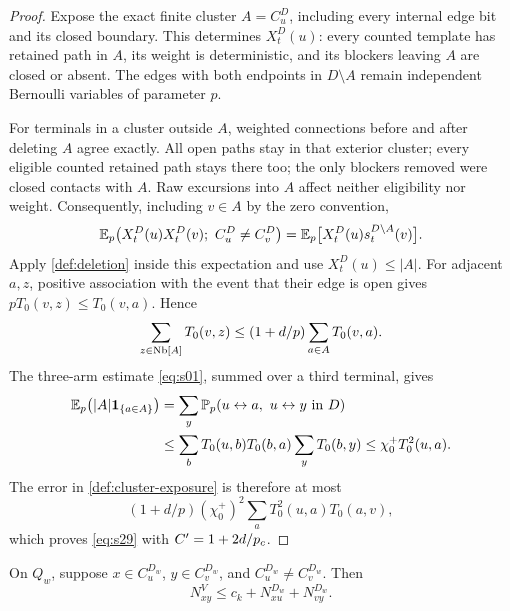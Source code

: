 \begin{proof}
Expose the exact finite cluster $A=C_u^D$, including every internal edge
bit and its closed boundary.  This determines $X_t^D(u)$: every counted
template has retained path in $A$, its weight is deterministic, and its
blockers leaving $A$ are closed or absent.  The edges with both endpoints
in $D\setminus A$ remain independent Bernoulli variables of parameter $p$.

For terminals in a cluster outside $A$, weighted connections before and
after deleting $A$ agree exactly.  All open paths stay in that exterior
cluster; every eligible counted retained path stays there too; the only
blockers removed were closed contacts with $A$.  Raw excursions into $A$
affect neither eligibility nor weight.  Consequently, including $v\in A$
by the zero convention,
\begin{equation}\label{def:cluster-exposure}
 \mathbb E_p\bigl(X_t^D(u)X_t^D(v);\ C_u^D\ne C_v^D\bigr)
 =\mathbb E_p\bigl[X_t^D(u)s_t^{D\setminus A}(v)\bigr].
\end{equation}
Apply \cref{def:deletion} inside this expectation and use
$X_t^D(u)\le |A|$.  For adjacent $a,z$, positive association with the event
that their edge is open gives $pT_0(v,z)\le T_0(v,a)$.  Hence
\[
 \sum_{z\in\operatorname{Nb}[A]}T_0(v,z)
 \le(1+d/p)\sum_{a\in A}T_0(v,a).
\]
The three-arm estimate \eqref{eq:s01}, summed over a third terminal, gives
\[
 \begin{split}
 \mathbb E_p\bigl(|A|\mathbf 1_{\{a\in A\}}\bigr)
 &=\sum_y\mathbb P_p(u\leftrightarrow a,\ u\leftrightarrow y\text{ in }D)\\
 &\le\sum_b T_0(u,b)T_0(b,a)\sum_y T_0(b,y)
 \le\chi_0^+T_0^2(u,a).
 \end{split}
\]
The error in \eqref{def:cluster-exposure} is therefore at most
\[
 (1+d/p)(\chi_0^+)^2\sum_a T_0^2(u,a)T_0(a,v),
\]
which proves \eqref{eq:s29} with $C'=1+2d/{p_c}$.
\end{proof}

\begin{lemma}\label{def:legs}
On $Q_w$, suppose
$x\in C_u^{D_w}$, $y\in C_v^{D_w}$, and
$C_u^{D_w}\ne C_v^{D_w}$.  Then
\begin{equation}\label{eq:s30}
 N^V_{xy}\le c_k+N^{D_w}_{xu}+N^{D_w}_{vy}.
\end{equation}
\end{lemma}


